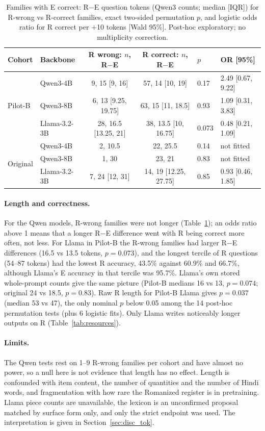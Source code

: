 \documentclass[12pt,a4paper,oneside]{report}
\renewcommand{\_}{\oldunderscore\allowbreak}
\begin{document}
\begin{table}[t]
\centering\small
\caption{Families with E correct: R$-$E question tokens (Qwen3 counts; median [IQR]) for R-wrong vs R-correct families, exact two-sided permutation $p$, and logistic odds ratio for R correct per $+$10 tokens [Wald 95\%]. Post-hoc exploratory; no multiplicity correction.}
\label{tab:tokcorr}
\setlength{\tabcolsep}{3pt}\footnotesize
\begin{tabular}{@{}llccll@{}}
\toprule
Cohort & Backbone & R wrong: $n$, R$-$E & R correct: $n$, R$-$E & $p$ & OR [95\%]\\
\midrule
\multirow{3}{*}{Pilot-B} & Qwen3-4B & 9, 15 [9, 16] & 57, 14 [10, 19] & 0.17 & 2.49 [0.67, 9.22]\\
 & Qwen3-8B & 6, 13 [9.25, 19.75] & 63, 15 [11, 18.5] & 0.93 & 1.09 [0.31, 3.83]\\
 & Llama-3.2-3B & 28, 16.5 [13.25, 21] & 38, 13.5 [10, 16.75] & 0.073 & 0.48 [0.21, 1.09]\\
\midrule
\multirow{3}{*}{Original} & Qwen3-4B & 2, 10.5 & 22, 25.5 & 0.14 & not fitted\\
 & Qwen3-8B & 1, 30 & 23, 21 & 0.83 & not fitted\\
 & Llama-3.2-3B & 7, 24 [12, 31] & 14, 19 [12.25, 27.75] & 0.85 & 0.93 [0.46, 1.85]\\
\bottomrule
\end{tabular}
\end{table}

\paragraph{Length and correctness.} For the Qwen models, R-wrong families were not longer (Table~\ref{tab:tokcorr}); an odds ratio above 1 means that a longer R$-$E difference went with R being correct more often, not less. For Llama in Pilot-B the R-wrong families had larger R$-$E differences (16.5 vs 13.5 tokens, $p = 0.073$), and the longest tercile of R questions (54--87 tokens) had the lowest R accuracy, 43.5\% against 60.9\% and 66.7\%, although Llama's E accuracy in that tercile was 95.7\%. Llama's own stored whole-prompt counts give the same picture (Pilot-B medians 16 vs 13, $p = 0.074$; original 24 vs 18.5, $p = 0.83$). Raw R length for Pilot-B Llama gives $p = 0.037$ (median 53 vs 47), the only nominal $p$ below 0.05 among the 14 post-hoc permutation tests (plus 6 logistic fits). Only Llama writes noticeably longer outputs on R (Table~\ref{tab:resources}).

\paragraph{Limits.} The Qwen tests rest on 1--9 R-wrong families per cohort and have almost no power, so a null here is not evidence that length has no effect. Length is confounded with item content, the number of quantities and the number of Hindi words, and fragmentation with how rare the Romanized register is in pretraining. Llama piece counts are unavailable, the lexicon is an unconfirmed proposal matched by surface form only, and only the strict endpoint was used. The interpretation is given in Section~\ref{sec:disc_tok}.
\end{document}
